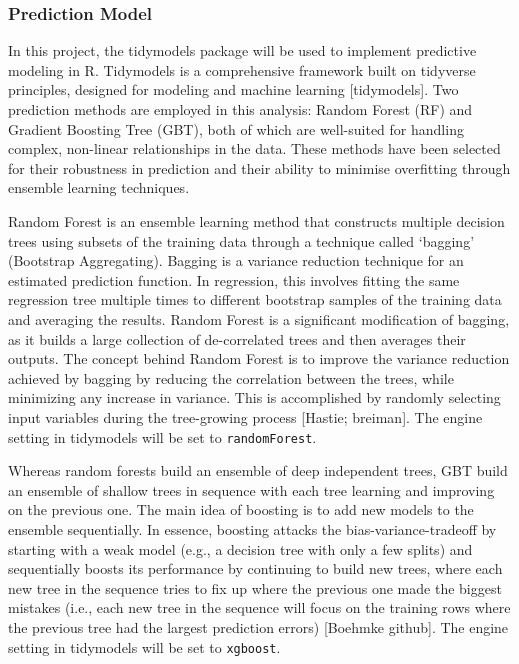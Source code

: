\documentclass[11pt,a4paper,]{article}
\begin{document}
\subsubsection{Prediction Model}\label{prediction-model}

In this project, the tidymodels package will be used to implement predictive modeling in R. Tidymodels is a comprehensive framework built on tidyverse principles, designed for modeling and machine learning {[}tidymodels{]}. Two prediction methods are employed in this analysis: Random Forest (RF) and Gradient Boosting Tree (GBT), both of which are well-suited for handling complex, non-linear relationships in the data. These methods have been selected for their robustness in prediction and their ability to minimise overfitting through ensemble learning techniques.

Random Forest is an ensemble learning method that constructs multiple decision trees using subsets of the training data through a technique called `bagging' (Bootstrap Aggregating). Bagging is a variance reduction technique for an estimated prediction function. In regression, this involves fitting the same regression tree multiple times to different bootstrap samples of the training data and averaging the results. Random Forest is a significant modification of bagging, as it builds a large collection of de-correlated trees and then averages their outputs. The concept behind Random Forest is to improve the variance reduction achieved by bagging by reducing the correlation between the trees, while minimizing any increase in variance. This is accomplished by randomly selecting input variables during the tree-growing process {[}Hastie; breiman{]}. The engine setting in tidymodels will be set to \texttt{randomForest}.

Whereas random forests build an ensemble of deep independent trees, GBT build an ensemble of shallow trees in sequence with each tree learning and improving on the previous one. The main idea of boosting is to add new models to the ensemble sequentially. In essence, boosting attacks the bias-variance-tradeoff by starting with a weak model (e.g., a decision tree with only a few splits) and sequentially boosts its performance by continuing to build new trees, where each new tree in the sequence tries to fix up where the previous one made the biggest mistakes (i.e., each new tree in the sequence will focus on the training rows where the previous tree had the largest prediction errors) {[}Boehmke github{]}. The engine setting in tidymodels will be set to \texttt{xgboost}.
\end{document}

